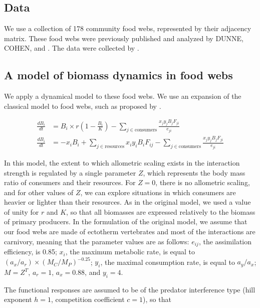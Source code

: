 \documentclass[12pt]{article}
\begin{document}
\subsection{Data}

We use a collection of 178 community food webs, represented by their adjacency matrix. These food webs were previously published and analyzed by DUNNE, COHEN, and \textcite{Havens1992}. The data were collected by \textcite{Gravel2011a}.

\subsection{A model of biomass dynamics in food webs}

We apply a dynamical model to these food webs. We use an expansion of the classical \textcite{Yodzis1992} model to food webs, such as proposed by \textcite{Brose2006a}. 

\begin{align}
	\frac{dB_{i}}{dt} & = B_{i}\times r\left(1-\frac{B_{i}}{K}\right) - \sum_{j\in\mathrm{consumers}}\frac{x_{j}y_{j}B_{j}F_{ji}}{e_{ji}}\\
	\frac{dB_{i}}{dt} & = -x_{i}B_{i} + \sum_{j\in\mathrm{resources}}x_{i}y_{i}B_{i}F_{ij} - \sum_{j\in\mathrm{consumers}}\frac{x_{j}y_{j}B_{j}F_{ji}}{e_{ji}}
\end{align}

In this model, the extent to which allometric scaling exists in the interaction
strength is regulated by a single parameter $Z$, which represents the body mass
ratio of consumers and their resources. For $Z = 0$, there is no allometric
scaling, and for other values of $Z$, we can explore situations in which
consumers are heavier or lighter than their resources. As in the original model,
we used a value of unity for $r$ and $K$, so that all biomasses are expressed
relatively to the biomass of primary producers. In the formulation of the
original model, we assume that our food webs are made of ectotherm vertebrates
and most of the interactions are carnivory, meaning that the parameter values
are as follows: $e_{ij}$, the assimilation efficiency, is 0.85; $x_{i}$, the
maximum metabolic rate, is equal to $(a_{x}/a_{r})\times(M_{C}/M_{P})^{-0.25}$;
$y_{i}$, the maximal consumption rate, is equal to $a_{y}/a_{x}$; $M = Z^{T}$,
$a_{r} = 1$, $a_{x} = 0.88$, and $y_{i} = 4$.

The functional responses are assumed to be of the predator interference type
(hill exponent $h = 1$, competition coefficient $c = 1$), so that
\end{document}
